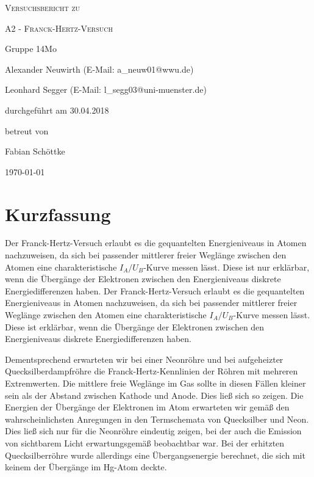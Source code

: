 \documentclass[
	a4paper,
	12pt,
	pagesize,
	ngerman
]{scrartcl}
\begin{document}
	
	\begin{titlepage}
		\centering
		{\scshape\LARGE Versuchsbericht zu \par}
		\vspace{1cm}
		{\scshape\huge A2 - Franck-Hertz-Versuch \par} 
		\vspace{2.5cm}
		{\LARGE Gruppe 14Mo \par}
		\vspace{0.5cm}
		
		{\large Alexander Neuwirth (E-Mail: a\_neuw01@wwu.de) \par}
		{\large Leonhard Segger (E-Mail: l\_segg03@uni-muenster.de) \par}
		\vfill
		
		durchgeführt am 30.04.2018\par
		betreut von\par
		{\large Fabian Schöttke}
		
		\vfill
		
		{\large \today\par}
	\end{titlepage}
	\tableofcontents
	\newpage


	\section{Kurzfassung}
	Der Franck-Hertz-Versuch erlaubt es die gequantelten Energieniveaus in Atomen nachzuweisen, da sich bei passender mittlerer freier Weglänge zwischen den Atomen eine charakteristische $I_A/U_B$-Kurve messen lässt.
	Diese ist nur erklärbar, wenn die Übergänge der Elektronen zwischen den Energieniveaus diskrete Energiedifferenzen haben.
	Der Franck-Hertz-Versuch erlaubt es die gequantelten Energieniveaus in Atomen nachzuweisen, da sich bei passender mittlerer freier Weglänge zwischen den Atomen eine charakteristische $I_A/U_B$-Kurve messen lässt.
	Diese ist erklärbar, wenn die Übergänge der Elektronen zwischen den Energieniveaus diskrete Energiedifferenzen haben.
	
	Dementsprechend erwarteten wir bei einer Neonröhre und bei aufgeheizter Quecksilberdampfröhre die Franck-Hertz-Kennlinien der Röhren mit mehreren Extremwerten.
	Die mittlere freie Weglänge im Gas sollte in diesen Fällen kleiner sein als der Abstand zwischen Kathode und Anode.
	Dies ließ sich so zeigen.
	Die Energien der Übergänge der Elektronen im Atom erwarteten wir gemäß den wahrscheinlichsten Anregungen in den Termschemata von Quecksilber und Neon.
	Dies ließ sich nur für die Neonröhre eindeutig zeigen, bei der auch die Emission von sichtbarem Licht erwartungsgemäß beobachtbar war.
	Bei der erhitzten Quecksilberröhre wurde allerdings eine Übergangsenergie berechnet, die sich mit keinem der Übergänge im Hg-Atom deckte.
		
\end{document}
